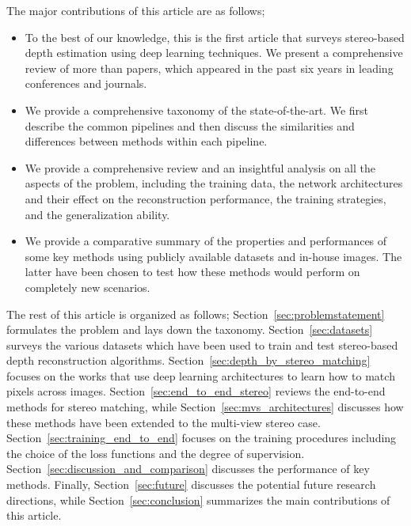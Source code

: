 \documentclass[10pt,journal,compsoc]{IEEEtran}
\newcommand{\noi}{\noindent}
\begin{document}
The major contributions of this article are as follows;
\begin{itemize}
	\item To the best of our knowledge, this is the first article that surveys stereo-based depth estimation using deep learning techniques. We present a comprehensive review of  more than  papers, which appeared in the past six years in leading conferences and journals.
	
	\item We provide a comprehensive taxonomy of the state-of-the-art. We first describe the common pipelines and then discuss the similarities and differences between methods within each pipeline.
	 
	\item  We provide a comprehensive review and an insightful analysis on all the aspects of the problem, including the training data, the network architectures and their effect on the  reconstruction performance, the training strategies, and the generalization ability. 
	
	\item We provide a comparative summary of the properties and performances of some key methods using publicly available datasets and in-house images. The latter have been chosen to test how these methods would perform on completely new scenarios. 
	
\end{itemize} 

\noi The rest of this article is organized as follows; Section~\ref{sec:problemstatement} formulates the problem and lays down the taxonomy. Section~\ref{sec:datasets} surveys the various datasets which have been used to train and test stereo-based depth reconstruction algorithms.  Section~\ref{sec:depth_by_stereo_matching}  focuses on the  works that use deep learning architectures to learn how to match pixels across images.  Section~\ref{sec:end_to_end_stereo} reviews  the end-to-end methods for stereo matching, while Section~\ref{sec:mvs_architectures} discusses how these methods have been extended to  the multi-view stereo case.   Section~\ref{sec:training_end_to_end} focuses on the training procedures including the choice of the loss functions and the degree of supervision.   Section~\ref{sec:discussion_and_comparison}  discusses the performance of  key methods. Finally, Section~\ref{sec:future}  discusses the potential future research directions, while Section~\ref{sec:conclusion}  summarizes the main contributions of this article. 
\end{document}

